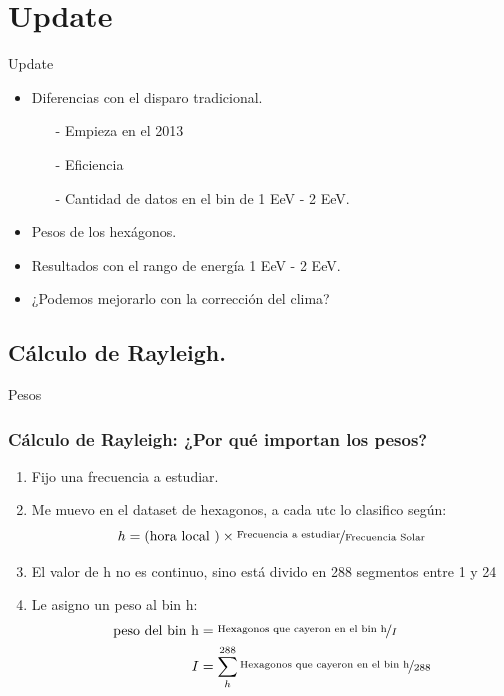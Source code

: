 \documentclass{beamer}
\begin{document}
\section{Update}

\begin{frame}{Update}

  \begin{itemize}
  	\item Diferencias con el disparo tradicional.
    \begin{itemize}
      \item[-] Empieza en el 2013
      \item[-] Eficiencia
      \item[-] Cantidad de datos en el bin de 1 EeV - 2 EeV.
    \end{itemize}
  	\item Pesos de los hexágonos.
  	\item Resultados con el rango de energía 1 EeV - 2 EeV.
    \item ¿Podemos mejorarlo con la corrección del clima?
  \end{itemize}


\end{frame}


\subsection{Cálculo de Rayleigh.}

\begin{frame}{Pesos}
\frametitle{Cálculo de Rayleigh: ¿Por qué importan los pesos?}

 \begin{enumerate}
   \item Fijo una frecuencia a estudiar.
   \item Me muevo en el dataset de hexagonos, a cada utc lo clasifico según:
   \begin{equation*}
     h = (\text{hora local })\times \nicefrac{\text{Frecuencia a estudiar}}{\text{Frecuencia Solar}}
   \end{equation*}
     \item El valor de h no es continuo, sino está divido en 288 segmentos entre 1 y 24
  \item Le asigno un peso al bin h:
   \begin{align*}
     \text{peso del bin h} &= \nicefrac{\text{Hexagonos que cayeron en el bin h}}{I}\\
     I &= \sum^{288}_h \nicefrac{\text{Hexagonos que cayeron en el bin h}}{288}
    \end{align*} 

 \end{enumerate}

\end{frame}
\end{document}

